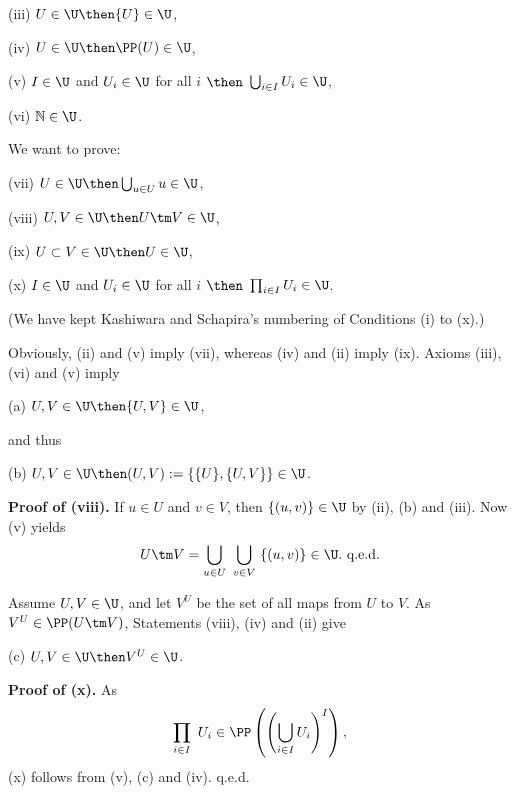 \documentclass[12pt]{article}
\theoremstyle{remark}
\theoremstyle{definition}
\begin{document}
(iii) $U\in\U\then\{U\}\in\U$,

(iv) $U\in\U\then\PP(U)\in\U$,

(v) $I\in\U$ and $U_i\in\U$ for all $i$ $\then$ $\bigcup_{i\in I}U_i\in\U$,

(vi) $\mathbb N\in\U$.

\nn We want to prove:

(vii) $U\in\U\then\bigcup_{u\in U}u\in\U$,

(viii) $U,V\in\U\then U\tm V\in\U$,

(ix) $U\subset V\in\U\then U\in\U$,

(x) $I\in\U$ and $U_i\in\U$ for all $i$ $\then$ $\prod_{i\in I}U_i\in\U$.

\nn(We have kept Kashiwara and Schapira's numbering of Conditions (i) to (x).) 

\nn Obviously, (ii) and (v) imply (vii), whereas (iv) and (ii) imply (ix). Axioms (iii), (vi) and (v) imply

(a) $U,V\in\U\then\{U,V\}\in\U$,

\nn and thus

(b) $U,V\in\U\then(U,V):=\{\{U\},\{U,V\}\}\in\U$.

\nn\textbf{Proof of (viii).} If $u\in U$ and $v\in V$, then $\{(u,v)\}\in\U$ by (ii), (b) and (iii). Now (v) yields 
$$
U\tm V=\bigcup_{u\in U}\ \bigcup_{v\in V}\ \{(u,v)\}\in\U.\text{ q.e.d.} 
$$ 

Assume $U,V\in\U$, and let $V^U$ be the set of all maps from $U$ to $V$. As $V^U\in\PP(U\tm V)$, Statements (viii), (iv) and (ii) give

(c) $U,V\in\U\then V^U\in\U$.

\nn\textbf{Proof of (x).} As 
$$
\prod_{i\in I}\ U_i\in\PP\left(\left(\bigcup_{i\in I}U_i\right)^I\right),
$$
(x) follows from (v), (c) and (iv). q.e.d.


\end{document}
